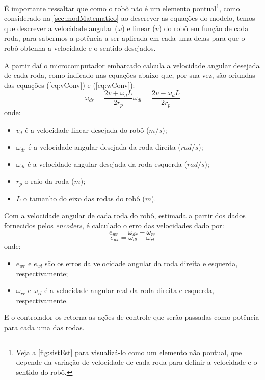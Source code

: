 É importante ressaltar que como o robô não é um elemento pontual\footnote{Veja a \autoref{fig:sistEst} para visualizá-lo como um elemento não pontual, que depende da variação de velocidade de cada roda para definir a velocidade e o sentido do robô.}, como considerado na \autoref{sec:modMatematico} ao descrever as equações do modelo, temos que descrever a velocidade angular (\emph{$\omega$}) e linear (\emph{$v$}) do robô em função de cada roda, para sabermos a potência a ser aplicada em cada uma delas para que o robô obtenha a velocidade e o sentido desejados.

A partir daí o %
microcomputador embarcado calcula a velocidade angular desejada de cada roda, como indicado nas equações abaixo que, por sua vez, são oriundas das equações (\ref{eq:vConv}) e (\ref{eq:wConv}):
\begin{subequations}
\begin{equation}
\omega_{dr} = \dfrac{2v + \omega_{d}L}{2r_{p}}	
\label{eq:velocangulardireita}
\end{equation} 
\begin{equation}
\omega_{dl} = \dfrac{2v - \omega_{d}L}{2r_{p}}	
\label{eq:velocangularesquerda}
\end{equation} 
\label{eq:convVelAngRodas}
\end{subequations}
onde:
\begin{itemize}
	\item $v_d$ é a velocidade linear desejada do robô ($m/s$);
	\item $\omega_{dr}$ é a velocidade angular desejada da roda direita ($rad/s$);
	\item $\omega_{dl}$ é a velocidade angular desejada da roda esquerda ($rad/s$);
	\item $r_{p}$ o raio da roda ($m$);
	\item $L$ o tamanho do eixo das rodas do robô ($m$).	
\end{itemize}

Com a velocidade angular de cada roda  do robô, estimada a partir dos dados fornecidos pelos \emph{encoders}, é calculado o erro das velocidades dado por:%
\begin{equation}
e_{wr} = \omega_{dr} - \omega_{rr}
\label{eq:errVelAngDireita}
\end{equation} 
\begin{equation}
e_{wl} = \omega_{dl} - \omega_{rl}
\label{eq:errVelAngEsquerda}
\end{equation} 
onde:
\begin{itemize}
	\item $e_{wr}$ e $e_{wl}$ são os erros da velocidade angular da roda direita e esquerda, respectivamente;
	\item $\omega_{rr}$ e $\omega_{rl}$ é a velocidade angular real da roda direita e esquerda, respectivamente.
\end{itemize}
E o controlador os retorna as ações de controle que serão passadas como potência para cada uma das rodas.	

